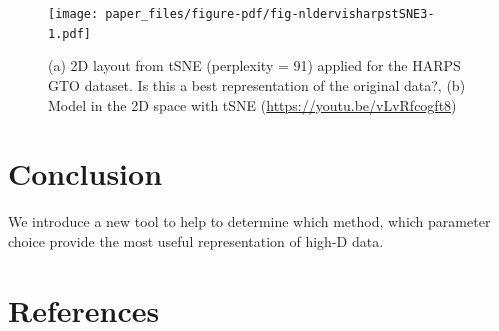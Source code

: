 \documentclass[
  12pt]{article}
\begin{document}
\begin{figure}[h]

{\centering \texttt{[image: paper\_files/figure-pdf/fig-nldervisharpstSNE3-1.pdf]}

}

\caption{\label{fig-nldervisharpstSNE3}(a) 2D layout from tSNE
(perplexity = 91) applied for the HARPS GTO dataset. Is this a best
representation of the original data?, (b) Model in the 2D space with
tSNE (\url{https://youtu.be/vLvRfcogft8})}

\end{figure}

\hypertarget{sec-conclusion}{%
\section{Conclusion}\label{sec-conclusion}}

We introduce a new tool to help to determine which method, which
parameter choice provide the most useful representation of high-D data.

\hypertarget{references}{%
\section*{References}\label{references}}

\renewcommand{\bibsection}{}


\newpage{}
\end{document}
